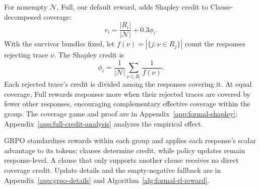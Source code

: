 For nonempty \(\mathcal N\), Full, our default reward, adds Shapley credit
to Clause-decomposed coverage:
\begin{equation}
\label{eq:generation-reward}
  r_i=\frac{|R_i|}{|\mathcal N|}+0.3\phi_i.
\end{equation}
With the survivor bundles fixed, let \(f(\nu)=|\{j:\nu\in R_j\}|\) count
the responses rejecting trace \(\nu\).  The Shapley credit is
\begin{equation}
  \phi_i=\frac{1}{|\mathcal N|}\sum_{\nu\in R_i}\frac{1}{f(\nu)}.
  \label{eq:method-shapley}
\end{equation}
Each rejected trace's credit is divided among the responses covering it.
At equal coverage, Full rewards responses more when their rejected traces
are covered by fewer other responses, encouraging complementary effective
coverage within the group.
The coverage game and proof are in Appendix~\ref{app:formal-shapley};
Appendix~\ref{app:full-credit-analysis} analyzes the empirical effect.

GRPO standardizes rewards within each group and applies each response's
scalar advantage to its tokens; clauses determine credit, while policy
updates remain response-level.  A clause that only supports another clause
receives no direct coverage credit.  Update details and the empty-negative
fallback are in Appendix~\ref{app:grpo-details} and
Algorithm~\ref{alg:formal-rl-reward}.
